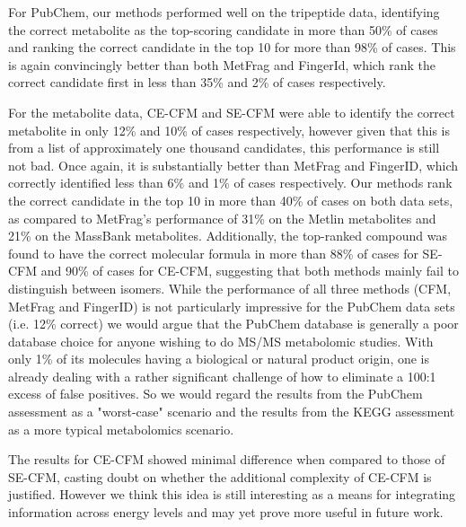 For PubChem, our methods performed well on the tripeptide data, identifying the correct metabolite as the top-scoring candidate in more than 50\% of cases and ranking the correct candidate in the top 10 for more than 98\% of cases. This is again convincingly better than both MetFrag and FingerId, which rank the correct candidate first in less than 35\% and 2\% of cases respectively.

For the metabolite data, CE-CFM and SE-CFM were able to identify the correct metabolite in only 12\% and 10\% of cases respectively, however given that this is from a list of approximately one thousand candidates, this performance is still not bad. Once again, it is substantially better than MetFrag and FingerID, which correctly identified less than 6\% and 1\% of cases respectively. Our methods rank the correct candidate in the top 10 in more than 40\% of cases on both data sets, as compared to MetFrag's performance of 31\% on the Metlin metabolites and 21\% on the MassBank metabolites. Additionally, the top-ranked compound was found to have the correct molecular formula in more than 88\% of cases for SE-CFM and 90\% of cases for CE-CFM, suggesting that both methods mainly fail to distinguish between isomers.  While the performance of all three methods (CFM, MetFrag and FingerID) is not particularly impressive for the PubChem data sets (i.e. 12\% correct) we would argue that the PubChem database is generally a poor database choice for anyone wishing to do MS/MS metabolomic studies.  With only 1\% of its molecules having a biological or natural product origin, one is already dealing with a rather significant challenge of how to eliminate a 100:1 excess of false positives.  So we would regard the results from the PubChem assessment as a "worst-case" scenario and the results from the KEGG assessment as a more typical metabolomics scenario.

The results for CE-CFM showed minimal difference when compared to those of SE-CFM, casting doubt on whether the additional complexity of CE-CFM is justified. 
However we think this idea is still interesting as a means for integrating information across energy levels and may yet prove more useful in future work.  

